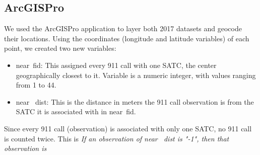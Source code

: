 \documentclass[12pt]{article}
\begin{document}
\subsection{ArcGISPro}
We used the ArcGISPro application to layer both 2017 datasets and geocode their locations. Using the coordinates (longitude and latitude variables) of each point, we created two new variables:
\begin{itemize}
    \item near\textunderscore\ fid: This assigned every 911 call with one SATC, the center geographically closest to it. Variable is a numeric integer, with values ranging from 1 to 44. 
    \item near \textunderscore\ dist: This is the distance in meters the 911 call observation is from the SATC it is associated with in near\textunderscore\ fid. 
\end{itemize}
Since every 911 call (observation) is associated with only one SATC, no 911 call is counted twice. This is
\textit{If an observation of near \textunderscore\ dist is "-1", then that observation is} 
\end{document}
